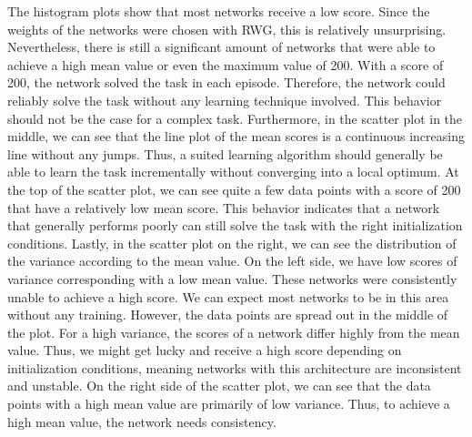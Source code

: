 The histogram plots show that most networks receive a low score. Since the weights of the networks were chosen with RWG, this is relatively unsurprising. Nevertheless, there is still a significant amount of networks that were able to achieve a high mean value or even the maximum value of 200. With a score of 200, the network solved the task in each episode. Therefore, the network could reliably solve the task without any learning technique involved. This behavior should not be the case for a complex task. Furthermore, in the scatter plot in the middle, we can see that the line plot of the mean scores is a continuous increasing line without any jumps. Thus, a suited learning algorithm should generally be able to learn the task incrementally without converging into a local optimum. At the top of the scatter plot, we can see quite a few data points with a score of 200 that have a relatively low mean score. This behavior indicates that a network that generally performs poorly can still solve the task with the right initialization conditions. Lastly, in the scatter plot on the right, we can see the distribution of the variance according to the mean value. On the left side, we have low scores of variance corresponding with a low mean value. These networks were consistently unable to achieve a high score. We can expect most networks to be in this area without any training. However, the data points are spread out in the middle of the plot. For a high variance, the scores of a network differ highly from the mean value. Thus, we might get lucky and receive a high score depending on initialization conditions, meaning networks with this architecture are inconsistent and unstable. On the right side of the scatter plot, we can see that the data points with a high mean value are primarily of low variance. Thus, to achieve a high mean value, the network needs consistency.

